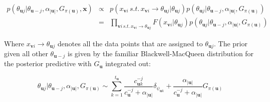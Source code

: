 \documentclass[11pt]{article}
\begin{document}
\begin{eqnarray}
p(\theta_{\mathbf{u}j}| \theta_{\mathbf{u}-j},\alpha_{|\mathbf{u}|},G_{\pi(\mathbf{u})},\mathbf{x}) & \propto & p(x_{\mathbf{v}i} \,s.t.\, x_{\mathbf{v}i} \rightarrow \theta_{\mathbf{u}j} | \theta_{\mathbf{u}j}) p(\theta_{\mathbf{u}j} | \theta_{\mathbf{u}-j},\alpha_{|\mathbf{u}|},G_{\pi(\mathbf{u})}) \nonumber \\
& = & \prod_{\mathbf{v}i \, s.t. \, x_{\mathbf{v}i} \rightarrow \theta_{\mathbf{u}j}} F(x_{\mathbf{v}i} | \theta_{\mathbf{u}j}) p(\theta_{\mathbf{u}j} | \theta_{\mathbf{u}-j},\alpha_{|\mathbf{u}|},G_{\pi(\mathbf{u})})
\end{eqnarray}

Where $x_{\mathbf{v}i} \rightarrow \theta_{\mathbf{u}j}$ denotes all the data points that are assigned to $\theta_{\mathbf{u}j}$.  The prior given all other $\theta_{\mathbf{u}-j}$ is given by the familiar Blackwell-MacQueen distribution for the posterior predictive with $G_{\mathbf{u}}$ integrated out:

\begin{equation}
\theta_{\mathbf{u}j} | \theta_{\mathbf{u}-j},\alpha_{|\mathbf{u}|},G_{\pi(\mathbf{u})} \sim \sum_{k = 1}^{t_{\mathbf{u}}} \frac{c_{\mathbf{u}k}^{-j}}{c_{\mathbf{u}}^{-j}+\alpha_{|\mathbf{u}|}} \delta_{\psi_{\mathbf{u}k}} + \frac{\alpha_{|\mathbf{u}|}}{c_{\mathbf{u}}^{-j}+\alpha_{|\mathbf{u}|}} G_{\pi(\mathbf{u})}
\end{equation}



\end{document}

